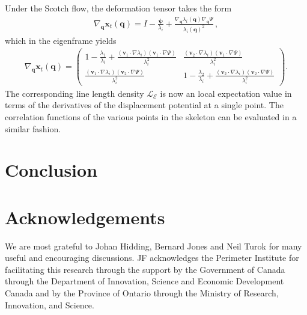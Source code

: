 \documentclass[a4paper, 11pt]{article}
\begin{document}
Under the Scotch flow, the deformation tensor takes the form
\begin{align}
\nabla_{\bm{q}}\bm{x}_t(\bm{q}) =I  - \frac{\bm{\psi}}{\lambda_i}  + \frac{\nabla_{\bm{q}} \lambda_i(\bm{q}) \nabla_{\bm{q}}\Psi}{\lambda_i(\bm{q})^2} \,,
\end{align}
which in the eigenframe yields
\begin{align}
\nabla_{\bm{q}}\bm{x}_t(\bm{q})
= 
\begin{pmatrix}
1 - \frac{\lambda_1}{\lambda_i} + \frac{(\bm{v}_1 \cdot \nabla \lambda_i) (\bm{v}_1 \cdot \nabla \Psi)}{\lambda_i^2} & \frac{(\bm{v}_2 \cdot \nabla \lambda_i) (\bm{v}_1 \cdot \nabla \Psi)}{\lambda_i^2} \\
\frac{(\bm{v}_1 \cdot \nabla \lambda_i) (\bm{v}_2 \cdot \nabla \Psi)}{\lambda_i^2} & 
1 - \frac{\lambda_2}{\lambda_i} + \frac{(\bm{v}_2 \cdot \nabla \lambda_i) (\bm{v}_2 \cdot \nabla \Psi)}{\lambda_i^2}
\end{pmatrix}.
\end{align}
The corresponding line length density $\mathcal{L}_{\mathcal{E}}$ is now an local expectation value in terms of the derivatives of the displacement potential at a single point. The correlation functions of the various points in the skeleton can be evaluated in a similar fashion.





\section{Conclusion}\label{sec:conclusion}


\section*{Acknowledgements}
We are most grateful to Johan Hidding, Bernard Jones and Neil Turok for many useful and encouraging discussions. JF acknowledges the Perimeter Institute for facilitating this research through the support by the Government of Canada through the Department of Innovation, Science and Economic Development Canada and by the Province of Ontario through the Ministry of Research, Innovation, and Science.

%



\end{document}

